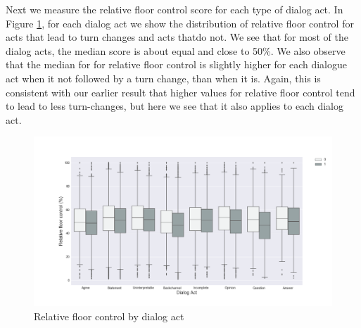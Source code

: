 Next we measure the relative floor control score for each type of dialog act.
In Figure \ref{fig:act:turn:rfc}, for each dialog act we show the distribution of relative floor control for acts that lead to turn changes and acts thatdo not. We see that for most of the dialog acts, the median score is about equal and close to 50\%.
%
We also observe that the median for for relative floor control is slightly higher for each dialogue act when it not followed by a turn change, than when it is.  Again, this is consistent with our earlier result that higher values for relative floor control tend to lead to less turn-changes, but here we see that it also applies to each dialog act.
%
\begin{figure}[ht!]
\centering
\includegraphics[width=\textwidth]{../scikitlearn/figures/f4.png}\vspace{-0.5em}
\caption{Relative floor control by dialog act}
\label{fig:act:turn:rfc}
\end{figure}

